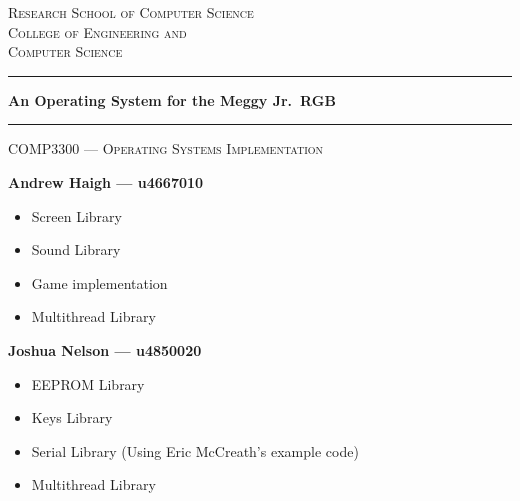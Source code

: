 \documentclass[a4paper,10pt]{article}
\newcommand\meggyjr{Meggy Jr.\ RGB}
\begin{document}
\begin{titlepage}
 
\begin{center}

\textsc{\Large Research School of Computer Science}\\[0.5cm]
\textsc{\Large College of Engineering and}\\[0.2cm]
\textsc{\Large Computer Science}\\[0.5cm]


 
\vspace{1.4cm}

\hrule

\vspace{1.4cm}

{ \huge \bfseries An Operating System for the \meggyjr}
\vspace{1.4cm}
\hrule
\vspace{1.0cm}

\textsc{\large COMP3300 --- Operating Systems Implementation}

\vspace{1.0cm}

\vspace{1.0cm}
{ \Large \bfseries Andrew Haigh --- u4667010}
\begin{itemize}
\item Screen Library
\item Sound Library
\item Game implementation
\item Multithread Library
\end{itemize}
\vspace{1.0cm}
{ \Large \bfseries Joshua Nelson --- u4850020}
\begin{itemize}
 \item EEPROM Library
 \item Keys Library
 \item Serial Library (Using Eric McCreath's example code)
 \item Multithread Library
\end{itemize}
\vfill
\begin{abstract}
A rudimentary operating system for the \meggyjr, a handheld device based on
the Atmel AVR architecture. A library useful to game developers was created,
including functions for interacting with the screen, sound, keys, memory, I/O,
and multithreading.
\end{abstract}
 
\end{center}

\end{titlepage}
\end{document}
